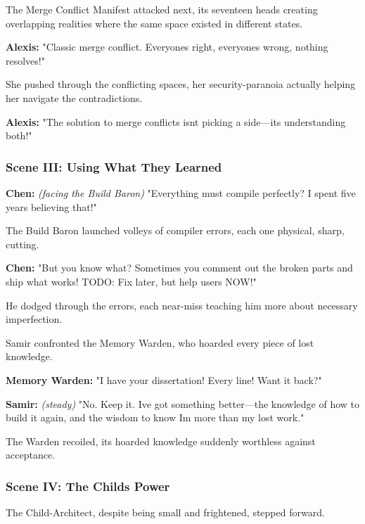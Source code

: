 The Merge Conflict Manifest attacked next, its seventeen heads creating overlapping realities where the same space existed in different states.

\textbf{Alexis:} "Classic merge conflict. Everyone\textquotesingle s right, everyone\textquotesingle s wrong, nothing resolves!"

She pushed through the conflicting spaces, her security-paranoia actually helping her navigate the contradictions.

\textbf{Alexis:} "The solution to merge conflicts isn\textquotesingle t picking a side---it\textquotesingle s understanding both!"

\bookdivider

\subsubsection{Scene III: Using What They Learned}\label{scene-iii-using-what-they-learned}

\textbf{Chen:} \emph{(facing the Build Baron)} "Everything must compile perfectly? I spent five years believing that!"

The Build Baron launched volleys of compiler errors, each one physical, sharp, cutting.

\textbf{Chen:} "But you know what? Sometimes you comment out the broken parts and ship what works! TODO: Fix later, but help users NOW!"

He dodged through the errors, each near-miss teaching him more about necessary imperfection.

Samir confronted the Memory Warden, who hoarded every piece of lost knowledge.

\textbf{Memory Warden:} "I have your dissertation! Every line! Want it back?"

\textbf{Samir:} \emph{(steady)} "No. Keep it. I\textquotesingle ve got something better---the knowledge of how to build it again, and the wisdom to know I\textquotesingle m more than my lost work."

The Warden recoiled, its hoarded knowledge suddenly worthless against acceptance.

\bookdivider

\subsubsection{Scene IV: The Child\textquotesingle s Power}\label{scene-iv-the-childs-power}

The Child-Architect, despite being small and frightened, stepped forward.

